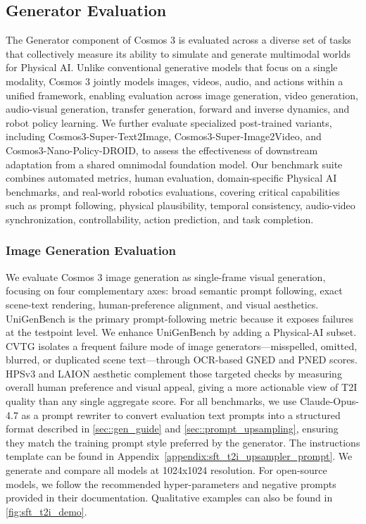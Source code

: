 \documentclass{llmxive}
\begin{document}
\subsection{Generator Evaluation}

The Generator component of Cosmos 3 is evaluated across a diverse set of tasks that collectively measure its ability to simulate and generate multimodal worlds for Physical AI. Unlike conventional generative models that focus on a single modality, Cosmos 3 jointly models images, videos, audio, and actions within a unified framework, enabling evaluation across image generation, video generation, audio-visual generation, transfer generation, forward and inverse dynamics, and robot policy learning. We further evaluate specialized post-trained variants, including Cosmos3-Super-Text2Image, Cosmos3-Super-Image2Video, and Cosmos3-Nano-Policy-DROID, to assess the effectiveness of downstream adaptation from a shared omnimodal foundation model. Our benchmark suite combines automated metrics, human evaluation, domain-specific Physical AI benchmarks, and real-world robotics evaluations, covering critical capabilities such as prompt following, physical plausibility, temporal consistency, audio-video synchronization, controllability, action prediction, and task completion.

\subsubsection{Image Generation Evaluation}
\label{subsec::image_eval}

\par \noindent
We evaluate Cosmos 3 image generation as single-frame visual generation, focusing on four complementary axes: broad semantic prompt following, exact scene-text rendering, human-preference alignment, and visual aesthetics.
UniGenBench is the primary prompt-following metric because it exposes failures at the testpoint level. We enhance UniGenBench by adding a Physical-AI subset.
CVTG isolates a frequent failure mode of image generators---misspelled, omitted, blurred, or duplicated scene text---through OCR-based GNED and PNED scores.
HPSv3 and LAION aesthetic complement those targeted checks by measuring overall human preference and visual appeal, giving a more actionable view of T2I quality than any single aggregate score.
For all benchmarks, we use Claude-Opus-4.7 as a prompt rewriter to convert evaluation text prompts into a structured format described in \cref{sec::gen_guide} and \cref{sec::prompt_upsampling}, ensuring they match the training prompt style preferred by the generator. The instructions template can be found in Appendix~\ref{appendix:sft_t2i_upsampler_prompt}. We generate and compare all models at 1024x1024 resolution. For open-source models, we follow the recommended hyper-parameters and negative prompts provided in their documentation. Qualitative examples can also be found in \cref{fig:sft_t2i_demo}.
\end{document}
